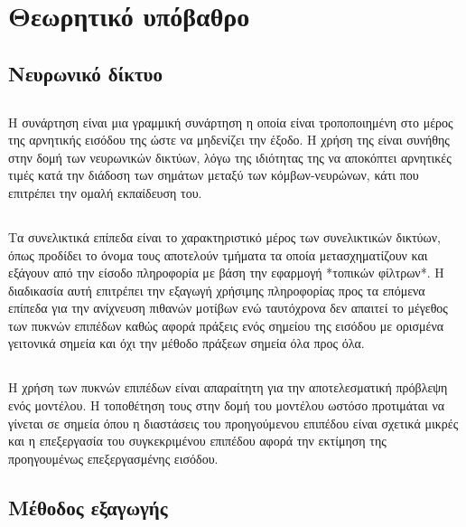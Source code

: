 \chapter{Θεωρητικό υπόβαθρο}
\label{ch:theoreteical_background}

\section{Νευρωνικό δίκτυο}

\section{}
Η συνάρτηση  είναι μια γραμμική συνάρτηση η οποία είναι τροποποιημένη στο μέρος της αρνητικής εισόδου της ώστε να μηδενίζει την έξοδο. Η χρήση της είναι συνήθης στην δομή των νευρωνικών δικτύων, λόγω της ιδιότητας της να αποκόπτει αρνητικές τιμές κατά την διάδοση των σημάτων μεταξύ των κόμβων-νευρώνων, κάτι που επιτρέπει την ομαλή εκπαίδευση του.

\section{}
Τα συνελικτικά επίπεδα είναι το χαρακτηριστικό μέρος των συνελικτικών δικτύων, όπως προδίδει το όνομα τους αποτελούν τμήματα τα οποία μετασχηματίζουν και εξάγουν από την είσοδο πληροφορία με βάση την εφαρμογή *τοπικών φίλτρων*. Η διαδικασία αυτή επιτρέπει την εξαγωγή χρήσιμης πληροφορίας προς τα επόμενα επίπεδα για την ανίχνευση πιθανών μοτίβων ενώ ταυτόχρονα δεν απαιτεί το μέγεθος των πυκνών  επιπέδων καθώς αφορά πράξεις ενός σημείου της εισόδου με ορισμένα γειτονικά σημεία και όχι την μέθοδο πράξεων σημεία όλα προς όλα.

\section{}
Η χρήση των πυκνών επιπέδων είναι απαραίτητη για την αποτελεσματική πρόβλεψη ενός μοντέλου. Η τοποθέτηση τους στην δομή του μοντέλου ωστόσο προτιμάται να γίνεται σε σημεία όπου η διαστάσεις του προηγούμενου επιπέδου είναι σχετικά μικρές και η επεξεργασία του συγκεκριμένου επιπέδου αφορά την εκτίμηση της προηγουμένως επεξεργασμένης εισόδου.

\section{Μέθοδος εξαγωγής }

